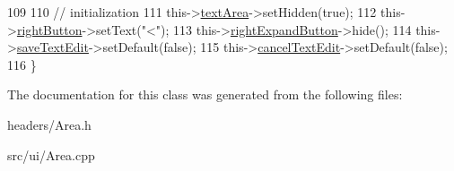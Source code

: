 \begin{DoxyCode}
109 
110     \textcolor{comment}{// initialization}
111     this->\hyperlink{classArea_a001e5b841c3e4126a128de13171f05d3}{textArea}->setHidden(\textcolor{keyword}{true});
112     this->\hyperlink{classArea_a7dda00e73b5dda5bcf308bc9451d47aa}{rightButton}->setText(\textcolor{stringliteral}{"<"});
113     this->\hyperlink{classArea_abe2c125e65ad35f1a154ec4b044a7cf1}{rightExpandButton}->hide();
114     this->\hyperlink{classArea_a9f02653780f96daba713c2e71e562da6}{saveTextEdit}->setDefault(\textcolor{keyword}{false});
115     this->\hyperlink{classArea_a48b08ee11ec952b793e8d92dfc9ef7d4}{cancelTextEdit}->setDefault(\textcolor{keyword}{false});
116 \}
\end{DoxyCode}


The documentation for this class was generated from the following files\+:\begin{DoxyCompactItemize}
\item 
headers/Area.\+h\item 
src/ui/Area.\+cpp\end{DoxyCompactItemize}
